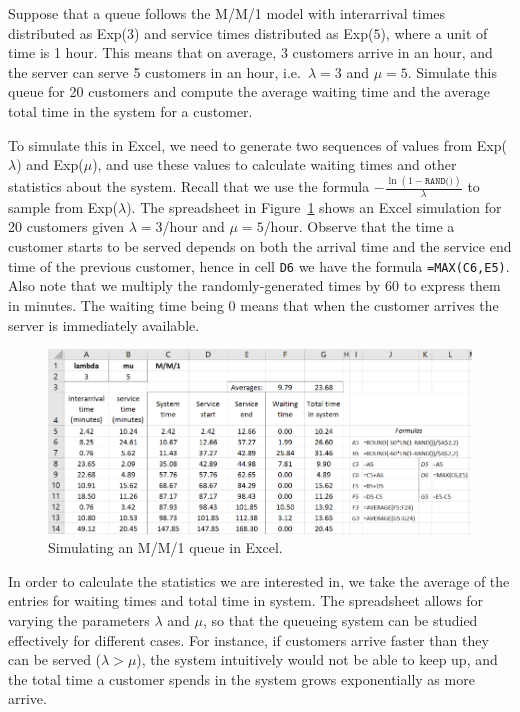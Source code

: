 \begin{myexample}\label{ex:4_MM1}
	Suppose that a queue follows the M/M/1 model with interarrival times distributed as Exp($3$) and service times distributed as Exp($5$), where a unit of time is 1 hour.
	This means that on average, 3 customers arrive in an hour, and the server can serve 5 customers in an hour,
 i.e.~$\lambda=3$ and $\mu=5$.
	Simulate this queue for 20 customers and compute the average waiting time and the average total time in the system for a customer.


To simulate this in Excel, we need to generate two sequences of values from Exp($\lambda$) and Exp($\mu$), and use these values to calculate waiting times and other statistics about the system.
Recall that we use the formula $-\frac{\ln(1-\texttt{RAND()})}{\lambda}$ to sample from Exp($\lambda$).
The spreadsheet in Figure~\ref{fig:4_queue1} shows an Excel simulation for 20 customers given $\lambda = 3$/hour and $\mu = 5$/hour.
Observe that the time a customer starts to be served depends on both the arrival time and the service end time of the previous customer, hence in cell \texttt{D6} we have the formula \texttt{=MAX(C6,E5)}.
Also note that we multiply the randomly-generated times by 60 to express them in minutes.
The waiting time being 0 means that when the customer arrives the server is immediately available.

\vspace{0.5cm}

\begin{figure}[htbp]
	\centering
	\includegraphics[width=\textwidth]{fig/4_queue1.png}
	\caption{Simulating an M/M/1 queue in Excel. \label{fig:4_queue1}}
\end{figure}

In order to calculate the statistics we are interested in, we take the average of the entries for waiting times and total time in system.
The spreadsheet allows for varying the parameters $\lambda$ and $\mu$, so that the queueing system can be studied effectively for different cases.
For instance, if customers arrive faster than they can be served ($\lambda > \mu$), the system intuitively would not be able to keep up, and the total time a customer spends in the system grows exponentially as more arrive.


\end{myexample}
